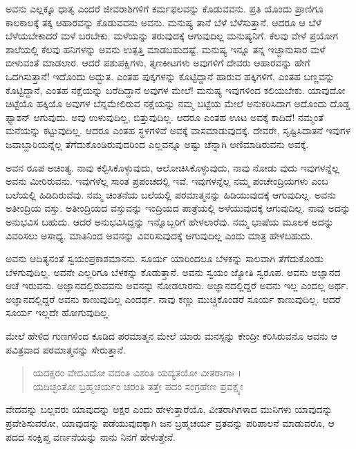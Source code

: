 ಅವನು ಎಲ್ಲಕ್ಕೂ ಧಾತೃ ಎಂದರೆ ಜೀವರಾಶಿಗಳಿಗೆ ಕರ್ಮಫಲವನ್ನು ಕೊಡುವವನು. ಪ್ರತಿ ಯೊಂದು ಪ್ರಾಣಿಗೂ ಕಾಲಕಾಲಕ್ಕೆ ತಕ್ಕ ಆಹಾರವನ್ನು ಕೊಡುವವನು ಅವನು. ಮನುಷ್ಯ ತಾನೆ ಬೆಳೆ ಬೆಳೆಸುತ್ತಾನೆ. ಆದರೂ ಆ ಬೆಳೆ ಬೆಳೆಯಬೇಕಾದರೆ ಮಳೆ ಬರಬೇಕು. ಮಳೆಯನ್ನು ತರುವುದಕ್ಕೆ ಆಗುವುದಿಲ್ಲ ಮನುಷ್ಯನಿಗೆ. ಕೆಲವು ವೇಳೆ ಪ್ರಯೋಗ ಶಾಲೆಯಲ್ಲಿ ಕೆಲವು ಹನಿಗಳನ್ನು ಅವನು ಉತ್ಪತ್ತಿ ಮಾಡಬಹುದಷ್ಟೆ. ಮನುಷ್ಯ ಇನ್ನೂ ತನ್ನ ಇಚ್ಛಾನುಸಾರ ಮಳೆ ಬೀಳುವಂತೆ ಮಾಡಲಾರ. ಆದರೆ ಪಶುಪಕ್ಷಿಗಳು, ತೃಣಕೀಟಗಳು ಅವುಗಳಿಗೆ ದೇವರು ಆಹಾರವನ್ನು ಹೇಗೆ ಒದಗಿಸುತ್ತಾನೆ! ಇದೊಂದು ಅದ್ಭುತ. ಎಂತಹ ಪುಕ್ಕಗಳನ್ನು ಕೊಟ್ಟಿದ್ದಾನೆ ಹಾರುವ ಹಕ್ಕಿಗಳಿಗೆ, ಎಂತಹ ಬಣ್ಣವನ್ನು ಕೊಟ್ಟಿದ್ದಾನೆ, ಎಂತಹ ನಕ್ಷೆಯನ್ನು ಬರೆದಿದ್ದಾನೆ ಅವುಗಳ ಮೇಲೆ! ಮನುಷ್ಯ ಇವುಗಳಿಂದ ಕಲಿಯಬೇಕು. ಯಾವುದೋ ಚಿಟ್ಟೆಯೊ ಹಕ್ಕಿಯೊ ಅವುಗಳ ಬೆನ್ನಮೇಲಿರುವ ನಕ್ಷೆಯನ್ನು ನಮ್ಮ ಬಟ್ಟೆಯ ಮೇಲೆ ಅನುಕರಿಸಿದಾಗ ಅದೊಂದು ದೊಡ್ಡ ಫ್ಯಾಶನ್ ಆಗುವುದು. ಅವು ಉಳುವುದಿಲ್ಲ, ಬಿತ್ತುವುದಿಲ್ಲ. ಆದರೂ ಎಂತಹ ಊಟ ಅವಕ್ಕೆ ಕಾದಿದೆ! ನಮ್ಮಂತೆ ಮನೆಯನ್ನು ಕಟ್ಟುವುದಿಲ್ಲ. ಆದರೂ ಎಂತಹ ಸ್ಥಳಗಳಿವೆ ಅವಕ್ಕೆ ವಾಸಮಾಡುವುದಕ್ಕೆ. ದೇವರೇ, ಸೃಷ್ಟಿಸಿದಾತನೆ ಇವುಗಳ ಜವಾಬ್ದಾರಿಯನ್ನೆಲ್ಲ ತೆಗೆದುಕೊಂಡಿರುವುದರಿಂದ ಎಲ್ಲವನ್ನೂ ಅಷ್ಟು ಚೆನ್ನಾಗಿ ಅಣಿಮಾಡಿರುವನು ಅವಕ್ಕೆ.

ಅವನ ರೂಪ ಅಚಿಂತ್ಯ. ನಾವು ಕಲ್ಪಿಸಿಕೊಳ್ಳುವುದು, ಆಲೋಚಿಸಿಕೊಳ್ಳುವುದು, ನಾವು ನೋಡು ವುದು ಇವುಗಳನ್ನೆಲ್ಲ ಅವನು ಮೀರಿರುವನು. ಇವುಗಳೆಲ್ಲ ಸಾಂತ ಪ್ರಪಂಚದಲ್ಲಿ ಇವೆ. ಇವುಗಳನ್ನೆಲ್ಲ ನಮ್ಮ ಪಂಚೇಂದ್ರಿಯಗಳು ಎಂಬ ಬಲೆಯಲ್ಲಿ ಹಿಡಿದಿರುವೆವು. ನಮ್ಮ ಚಿಂತನೆಯ ಬಲೆಯಲ್ಲಿ ಪರಮಾತ್ಮನನ್ನು ಹಿಡಿಯುವುದಕ್ಕೆ ಆಗುವುದಿಲ್ಲ. ಅವನು ಅತೀಂದ್ರಿಯ ವಸ್ತು. ಅತೀಂದ್ರಿಯದ ವಸ್ತುವನ್ನು ಇಂದ್ರಿಯದ ಪಾತ್ರೆಯಲ್ಲಿ ಅಳೆಯುವುದಕ್ಕೆ ಆಗುವುದಿಲ್ಲ. ನಾವು ಅದನ್ನು ಅನುಭವಿಸ ಬಹುದು. ಆದರೆ ಅನುಭವಿಸಿದ್ದನ್ನು ಇನ್ನೊಬ್ಬರಿಗೆ ಹೇಳಲಾರೆವು. ನಮ್ಮ ಭಾಷೆಯ ಮೂಲಕ ಅದನ್ನು ವಿವರಿಸಲು ಅಸಾಧ್ಯ. ಮಾತಿನಿಂದ ಅವನನ್ನು ವಿವರಿಸುವುದಕ್ಕೆ ಆಗುವುದಿಲ್ಲ ಎಂದು ಮಾತ್ರ ಹೇಳಬಹುದು.

ಅವನು ಆದಿತ್ಯನಂತೆ ಸ್ವಯಂಪ್ರಕಾಶಮಾನನು. ಸೂರ್ಯ ಯಾರಿಂದಲೂ ಬೆಳಕನ್ನು ಸಾಲವಾಗಿ ತೆಗೆದುಕೊಂಡು ಬೆಳಗುವುದಿಲ್ಲ. ಅವನೇ ಎಲ್ಲರಿಗೂ ಬೆಳಕನ್ನು ಕೊಡುತ್ತಾನೆ. ಅವನು ಸ್ವಯಂ ಜ್ಯೋತಿ ಸ್ವರೂಪ. ಅವನು ಅಜ್ಞಾನದ ಆಚೆ ಇರುವನು. ಅಜ್ಞಾನದಲ್ಲಿರುವವನು ಅವನನ್ನು ನೋಡಲಾರನು. ಅಜ್ಞಾನದಲ್ಲಿದ್ದರೆ ಅವನು ಇಲ್ಲ ಎಂದಲ್ಲ ಅರ್ಥ. ಅಜ್ಞಾನದಲ್ಲಿದ್ದರೆ ಅವನು ಕಾಣುವುದಿಲ್ಲ ಎಂದರ್ಥ. ನಾವು ಕಣ್ಣು ಮುಚ್ಚಿಕೊಂಡರೆ ಸೂರ್ಯ ಕಾಣುವುದಿಲ್ಲ. ಆದರೆ ಸೂರ್ಯ ಇಲ್ಲದೇ ಹೋಗುವುದಿಲ್ಲ.

ಮೇಲೆ ಹೇಳಿದ ಗುಣಗಳಿಂದ ಕೂಡಿದ ಪರಮಾತ್ಮನ ಮೇಲೆ ಯಾರು ಮನಸ್ಸನ್ನು ಕೇಂದ್ರೀ ಕರಿಸಿರುವನೊ ಅವನು ಆ ಪವಿತ್ರವಾದ ಪರಮಾತ್ಮನನ್ನು ಸೇರುತ್ತಾನೆ.

\begin{verse}
ಯದಕ್ಷರಂ ವೇದವಿದೋ ವದಂತಿ ವಿಶಂತಿ ಯದ್ಯತಯೋ ವೀತರಾಗಾಃ ।\\ಯದಿಚ್ಛಂತೋ ಬ್ರಹ್ಮಚರ್ಯಂ ಚರಂತಿ ತತ್ತೇ ಪದಂ ಸಂಗ್ರಹೇಣ ಪ್ರವಕ್ಷ್ಯೇ 
\end{verse}

{\small ವೇದವನ್ನು ಬಲ್ಲವರು ಯಾವುದನ್ನು ಅಕ್ಷರ ಎಂದು ಹೇಳುತ್ತಾರೆಯೊ, ವೀತರಾಗಿಗಳಾದ ಮುನಿಗಳು ಯಾವುದನ್ನು ಪ್ರವೇಶಿಸುವರೋ, ಯಾವುದನ್ನು ಪಡೆಯುವುದಕ್ಕಾಗಿ ಜನ ಬ್ರಹ್ಮಚರ್ಯ ವ್ರತವನ್ನು ಪರಿಪಾಲನೆ ಮಾಡುವರೊ, ಆ ಪದದ ಸಂಕ್ಷಿಪ್ತ ವರ್ಣನೆಯನ್ನು ನಾನು ನಿನಗೆ ಹೇಳುತ್ತೇನೆ.}

